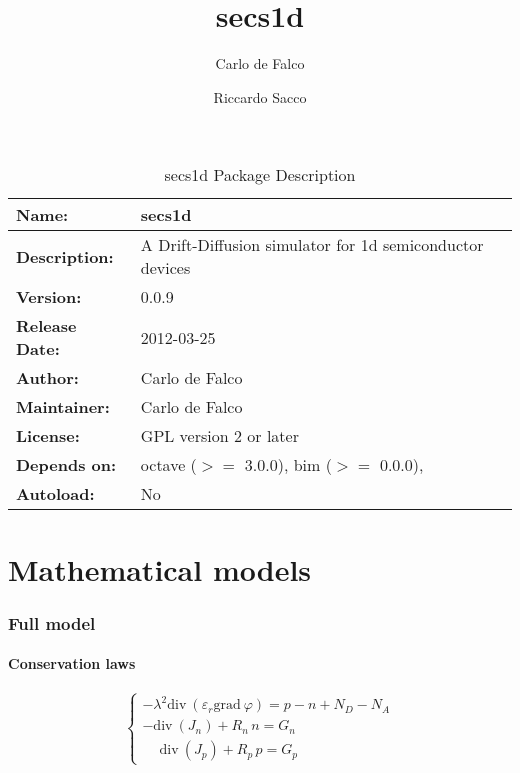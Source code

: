 \documentclass[9pt]{amsart}
\title{secs1d}
\author{Carlo de Falco \and Riccardo Sacco}
\begin{document}
\maketitle
\titlepage
\tableofcontents

\begin{table}
\caption{secs1d Package Description}
\centering
\begin{tabular}{|l|l|}
\hline
{\bf Name: } & secs1d\\  \hline
{\bf Description: } &
A Drift-Diffusion simulator for 1d semiconductor devices\\  \hline
{\bf Version: } & 0.0.9\\  \hline
{\bf Release Date: } & 2012-03-25\\  \hline
{\bf Author: } & Carlo de Falco\\   \hline
{\bf Maintainer: } & Carlo de Falco\\  \hline
{\bf License: } & GPL version 2 or later\\  \hline
{\bf Depends on: } &
octave ($>=$ 3.0.0), bim ($>=$ 0.0.0), \\  \hline
{\bf Autoload: } &No\\  \hline
\end{tabular}
\end{table}
\clearpage

\part{Mathematical models}

\section{Full model}
\subsection{Conservation laws}

\begin{equation}\label{eq:conservation}
\left\{
\begin{array}{ll}
-\lambda^{2}\mathrm{div}\ \left(\varepsilon_{r} \mathrm{grad}\ 
\varphi \right) = p - n + N_{D} - N_{A} \\[5mm]
-\mathrm{div}\ \left(J_{n} \right) + R_{n} \, n = G_{n} \\[5mm]
\phantom{-}\mathrm{div}\ \left(J_{p} \right) + R_{p} \, p = G_{p}
\end{array}
\right.
\end{equation}
\end{document}
